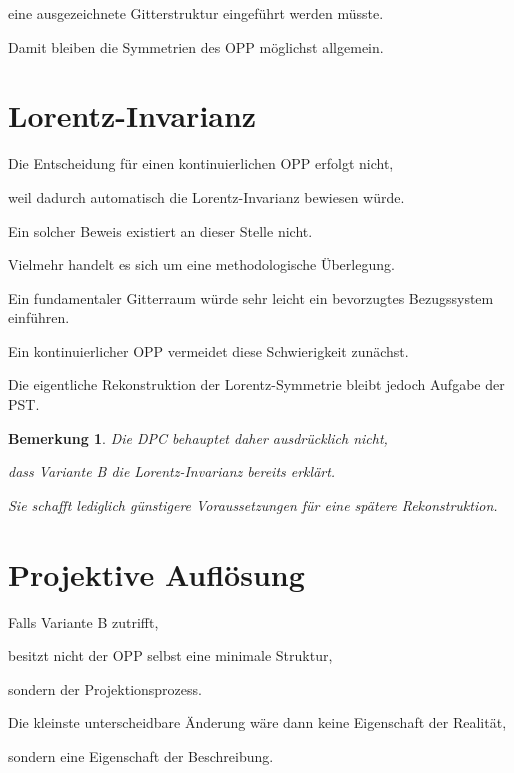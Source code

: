 \documentclass[11pt,a4paper]{article}
\newtheorem{remark}{Bemerkung}
\begin{document}
eine ausgezeichnete Gitterstruktur eingeführt werden
müsste.

Damit bleiben die Symmetrien des OPP möglichst allgemein.

\section{Lorentz-Invarianz}

Die Entscheidung für einen kontinuierlichen OPP erfolgt
nicht,

weil dadurch automatisch die Lorentz-Invarianz bewiesen
würde.

Ein solcher Beweis existiert an dieser Stelle nicht.

Vielmehr handelt es sich um eine methodologische
Überlegung.

Ein fundamentaler Gitterraum würde sehr leicht ein
bevorzugtes Bezugssystem einführen.

Ein kontinuierlicher OPP vermeidet diese Schwierigkeit
zunächst.

Die eigentliche Rekonstruktion der Lorentz-Symmetrie
bleibt jedoch Aufgabe der PST.

\begin{remark}

Die DPC behauptet daher ausdrücklich nicht,

dass Variante B die Lorentz-Invarianz bereits erklärt.

Sie schafft lediglich günstigere Voraussetzungen für
eine spätere Rekonstruktion.

\end{remark}

\section{Projektive Auflösung}

Falls Variante B zutrifft,

besitzt nicht der OPP selbst eine minimale Struktur,

sondern der Projektionsprozess.

Die kleinste unterscheidbare Änderung wäre dann keine
Eigenschaft der Realität,

sondern eine Eigenschaft der Beschreibung.
\end{document}
